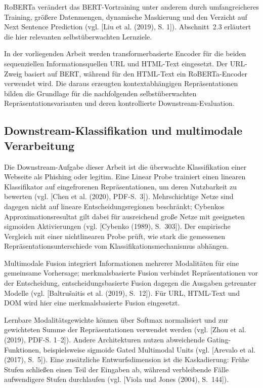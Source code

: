 RoBERTa verändert das BERT-Vortraining unter anderem durch umfangreicheres Training, größere Datenmengen, dynamische Maskierung und den Verzicht auf Next Sentence Prediction (vgl. [Liu et al. (2019), S. 1]). Abschnitt~2.3 erläutert die hier relevanten selbstüberwachten Lernziele.

In der vorliegenden Arbeit werden transformerbasierte Encoder für die
beiden sequenziellen Informationsquellen URL und HTML-Text eingesetzt.
Der URL-Zweig basiert auf BERT, während für den HTML-Text ein
RoBERTa-Encoder verwendet wird. Die daraus erzeugten
kontextabhängigen Repräsentationen bilden die Grundlage für die
nachfolgenden selbstüberwachten Repräsentationsvarianten und deren
kontrollierte Downstream-Evaluation.

\subsection{Downstream-Klassifikation und multimodale Verarbeitung}

Die Downstream-Aufgabe dieser Arbeit ist die überwachte Klassifikation einer Webseite als Phishing oder legitim. Eine Linear Probe trainiert einen linearen Klassifikator auf eingefrorenen Repräsentationen, um deren Nutzbarkeit zu bewerten (vgl. [Chen et al. (2020), PDF-S.~3]). Mehrschichtige Netze sind dagegen nicht auf lineare Entscheidungsregionen beschränkt; Cybenkos Approximationsresultat gilt dabei für ausreichend große Netze mit geeigneten sigmoiden Aktivierungen (vgl. [Cybenko (1989), S.~303]). Der empirische Vergleich mit einer nichtlinearen Probe prüft, wie stark die gemessenen Repräsentationsunterschiede vom Klassifikationsmechanismus abhängen.

Multimodale Fusion integriert Informationen mehrerer Modalitäten für eine gemeinsame Vorhersage; merkmalsbasierte Fusion verbindet Repräsentationen vor der Entscheidung, entscheidungsbasierte Fusion dagegen die Ausgaben getrennter Modelle (vgl. [Baltrušaitis et al. (2019), S.~12]). Für URL, HTML-Text und DOM wird hier eine merkmalsbasierte Fusion eingesetzt.

Lernbare Modalitätsgewichte können über Softmax normalisiert und zur gewichteten Summe der Repräsentationen verwendet werden (vgl. [Zhou et al. (2019), PDF-S. 1--2]). Andere Architekturen nutzen abweichende Gating-Funktionen, beispielsweise sigmoide Gated Multimodal Units (vgl. [Arevalo et al. (2017), S.~5]). Eine zusätzliche Entwurfsdimension ist die Kaskadierung: Frühe Stufen schließen einen Teil der Eingaben ab, während verbleibende Fälle aufwendigere Stufen durchlaufen (vgl. [Viola und Jones (2004), S.~144]).



